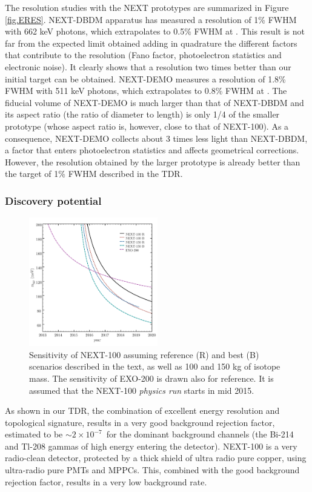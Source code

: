 The resolution studies with the NEXT prototypes are summarized in Figure \ref{fig.ERES}. NEXT-DBDM apparatus has measured a resolution of 1\% FWHM with 
662 keV photons, which extrapolates to 0.5\% FWHM at \Qbb. This result is not far from the expected limit obtained adding in quadrature the different factors that contribute to the resolution (Fano factor, photoelectron statistics and electronic noise). It clearly shows that a resolution two times better than our initial target can be obtained. NEXT-DEMO measures a resolution of 1.8\% FWHM with 
511 keV photons, which extrapolates to 0.8\% FWHM at \Qbb. The fiducial volume of NEXT-DEMO is much larger than that of NEXT-DBDM and its aspect ratio (the ratio of diameter to length) is only 1/4 of the smaller prototype (whose aspect ratio is, however, close to that of NEXT-100). As a consequence, NEXT-DEMO collects about 3 times less light than NEXT-DBDM, a factor that enters photoelectron statistics and affects geometrical corrections. However, the resolution obtained by the larger prototype is already better than the target of 1\% FWHM described in the TDR.
\subsubsection*{Discovery potential}

\begin{figure}
\centering
\includegraphics[width=0.5\textwidth]{img/EXOvsNEXT2.pdf}
\caption{Sensitivity of NEXT-100 assuming reference (R) and best (B) scenarios described in the text, as well as 100 and 150 kg of isotope mass.  The sensitivity of EXO-200 is drawn also for reference. It is assumed that the NEXT-100 \emph{physics run} starts in mid 2015.} \label{fig.exoNext}
\end{figure}

As shown in our TDR, the combination of excellent energy resolution and topological signature, results in a very good background rejection factor, estimated to be $\sim 2 \times 10^{-7}$~for the dominant background channels (the Bi-214 and Tl-208 
gammas of high energy entering the detector). NEXT-100 is a very radio-clean detector, protected by a thick shield of ultra radio pure copper, using ultra-radio pure PMTs and MPPCs. This, combined with the good background rejection factor, results in a very low background rate.

